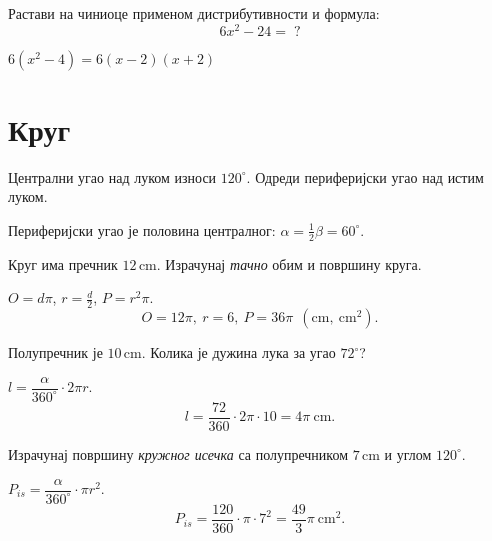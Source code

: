 \documentclass[11pt,a5paper,twoside,addpoints,answers]{exam} %
\newcommand{\measure}[2]{#1\,\mathrm{#2}}
\newcommand{\variant}[3]{#1}
\begin{document}
\begin{questions}
\question[4]
Растави на чиниоце применом дистрибутивности и формула:
\[
\variant{
6x^2-24= \;?
}{
12a^2+18a= \;?
}{
9m^2-4n^2= \;?
}
\]
\begin{solution}[\stretch 2]
\variant{
$6(x^2-4)=6(x-2)(x+2)$
}{
$6a(2a+3)$
}{
$(3m-2n)(3m+2n)$.
}
\end{solution}

\ifprintanswers\else\newpage\fi

\section*{Круг}

\question[2]
Централни угао над луком износи
\(\variant{120^\circ}{150^\circ}{90^\circ}\).
Одреди периферијски угао над истим луком.
\begin{solution}[\stretch 1]
Периферијски угао је половина централног: 
\(\alpha=\tfrac{1}{2}\beta=
\variant{60^\circ}{75^\circ}{45^\circ}\).
\end{solution}

\question[3]
Круг има пречник
\(\variant{\measure{12}{cm}}{\measure{9}{cm}}{\measure{14}{cm}}\).
Израчунај \emph{тачно} обим и површину круга.
\begin{solution}[\stretch 2]
$O=d\pi$, $r=\frac d2$, $P=r^2\pi$.
\[
\variant{
O=12\pi,\ r=6,\ P=36\pi
}{
O=9\pi,\ r=4{,}5,\ P=\frac{81}{4}\pi
}{
O=14\pi,\ r=7,\ P=49\pi
}\ \ (\mathrm{cm},\ \mathrm{cm}^2).
\]
\end{solution}

\question[3]
Полупречник је
\(\variant{\measure{10}{cm}}{\measure{8}{cm}}{\measure{6}{cm}}\).
Колика је дужина лука за угао
\(\variant{72^\circ}{135^\circ}{30^\circ}\)?
\begin{solution}[\stretch 2]
$l=\dfrac{\alpha}{360^\circ}\cdot 2\pi r$.
\[
\variant{
l=\frac{72}{360}\cdot 2\pi\cdot 10
=4\pi\ \mathrm{cm}
}{
l=\frac{135}{360}\cdot 2\pi\cdot 8
=6\pi\ \mathrm{cm}
}{
l=\frac{30}{360}\cdot 2\pi\cdot 6
=\pi\ \mathrm{cm}
}.
\]
\end{solution}

\question[3]
Израчунај површину \emph{кружног исечка} са полупречником
\(\variant{\measure{7}{cm}}{\measure{9}{cm}}{\measure{5}{cm}}\)
и углом
\(\variant{120^\circ}{45^\circ}{150^\circ}\).
\begin{solution}[\stretch 2]
$P_{is}=\dfrac{\alpha}{360^\circ}\cdot \pi r^2$.
\[
\variant{
P_{is}=\frac{120}{360}\cdot \pi\cdot 7^2
=\frac{49}{3}\pi
}{
P_{is}=\frac{45}{360}\cdot \pi\cdot 9^2
=\frac{81}{8}\pi
}{
P_{is}=\frac{150}{360}\cdot \pi\cdot 5^2
=\frac{125}{12}\pi
}\ \mathrm{cm}^2.
\]
\end{solution}


\end{questions}
\end{document}
